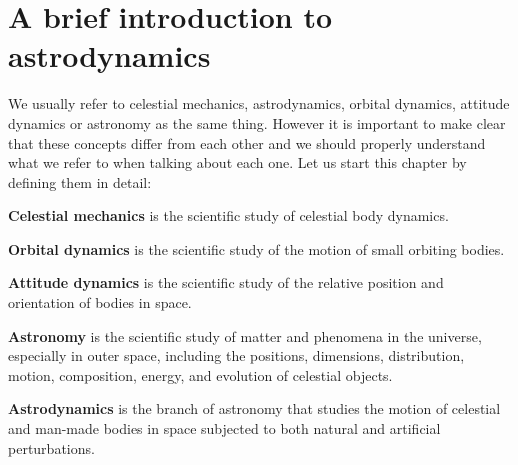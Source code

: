 \chapter[A brief introduction to astrodynamics]{A brief introduction to astrodynamics}
 
We usually refer to celestial mechanics, astrodynamics, orbital dynamics, attitude dynamics or astronomy as the same thing. However it is important to make clear that these concepts differ from each other and we should properly understand what we refer to when talking about each one. Let us start this chapter by defining them in detail:

\vspace{0.25cm}
\begin{Definition*}{}
	\textbf{Celestial mechanics} is the scientific study of celestial body dynamics.
\end{Definition*}
\vspace{0.25cm}

\vspace{0.25cm}
\begin{Definition*}{}
	\textbf{Orbital dynamics} is the scientific study of the motion of small orbiting bodies.
\end{Definition*}
\vspace{0.25cm}

\vspace{0.25cm}
\begin{Definition*}{}
	\textbf{Attitude dynamics} is the scientific study of the relative position and orientation of bodies in space.
\end{Definition*}
\vspace{0.25cm}

\vspace{0.25cm}
\begin{Definition*}{}
	\textbf{Astronomy} is  the scientific study of matter and phenomena in the universe, especially in outer space, including the positions, dimensions, distribution, motion, composition, energy, and evolution of celestial objects.
\end{Definition*}
\vspace{0.25cm}

\begin{Definition*}{}
	\textbf{Astrodynamics} is the branch of astronomy that studies the motion of celestial and man-made bodies in space subjected to both natural and artificial perturbations.
\end{Definition*}
\vspace{0.25cm}

